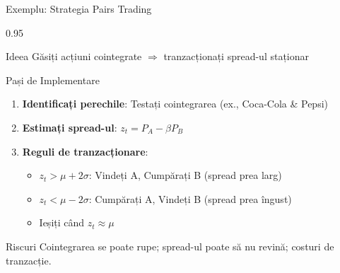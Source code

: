 \documentclass[9pt, aspectratio=169, t]{beamer}
\begin{document}
\begin{frame}{Exemplu: Strategia Pairs Trading}
    \begin{cminipage}{0.95\textwidth}
    {\small
    \begin{block}{Ideea}
        Găsiți acțiuni cointegrate $\Rightarrow$ tranzacționați spread-ul staționar
    \end{block}
    \begin{exampleblock}{Pași de Implementare}
        \begin{enumerate}\setlength{\itemsep}{0pt}
            \item \textbf{Identificați perechile}: Testați cointegrarea (ex., Coca-Cola \& Pepsi)
            \item \textbf{Estimați spread-ul}: $z_t = P_A - \beta P_B$
            \item \textbf{Reguli de tranzacționare}:
            \begin{itemize}\setlength{\itemsep}{0pt}
                \item $z_t > \mu + 2\sigma$: Vindeți A, Cumpărați B (spread prea larg)
                \item $z_t < \mu - 2\sigma$: Cumpărați A, Vindeți B (spread prea îngust)
                \item Ieșiți când $z_t \approx \mu$
            \end{itemize}
        \end{enumerate}
    \end{exampleblock}
    \begin{alertblock}{Riscuri}
        Cointegrarea se poate rupe; spread-ul poate să nu revină; costuri de tranzacție.
    \end{alertblock}
    }
    \end{cminipage}
\end{frame}
\end{document}
